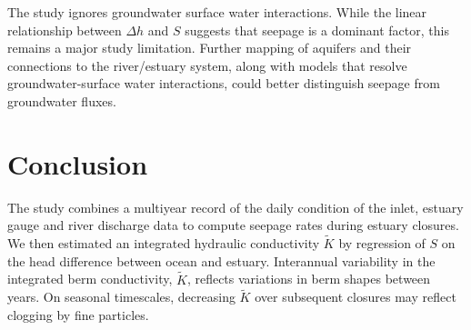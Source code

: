 \documentclass[preprint,12pt,authoryear]{elsarticle}
\begin{document}
The study ignores groundwater surface water interactions. While the linear relationship between $\Delta h$ and $S$ suggests that seepage is a dominant factor, this remains a major study limitation.
Further mapping of aquifers and their connections to the river/estuary system, along with models that resolve groundwater-surface water interactions, could better distinguish seepage from groundwater fluxes.


\section{Conclusion}

The study combines a multiyear record of the daily condition of the inlet, estuary gauge and river discharge data to compute seepage rates during estuary closures.
We then estimated an integrated hydraulic conductivity $\tilde K$ by regression of $S$ on the head difference between ocean and estuary.
Interannual variability in the integrated berm conductivity, $\tilde K$, reflects variations in berm shapes between years. 
On seasonal timescales, decreasing $\tilde K$ over subsequent closures may reflect clogging by fine particles.


 
  
 
\end{document}
